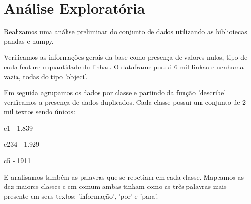 \section{Análise Exploratória}
\label{sec:analysis}

Realizamos uma análise preliminar do conjunto de dados utilizando as bibliotecas pandas e numpy.

Verificamos as informações gerais da base como presença de valores nulos, tipo de cada feature e quantidade de linhas. O dataframe possui 6 mil linhas e nenhuma vazia, todas do tipo 'object'. 

Em seguida agrupamos os dados por classe e partindo da função 'describe' verificamos a presença de dados duplicados. Cada classe possui um conjunto de 2 mil textos sendo únicos:

c1 - 1.839

c234 - 1.929

c5 - 1911

E analisamos também as palavras que se repetiam em cada classe. Mapeamos as dez maiores classes e em comum ambas tinham como as três palavras mais presente em seus textos: 'informação', 'por' e 'para'.